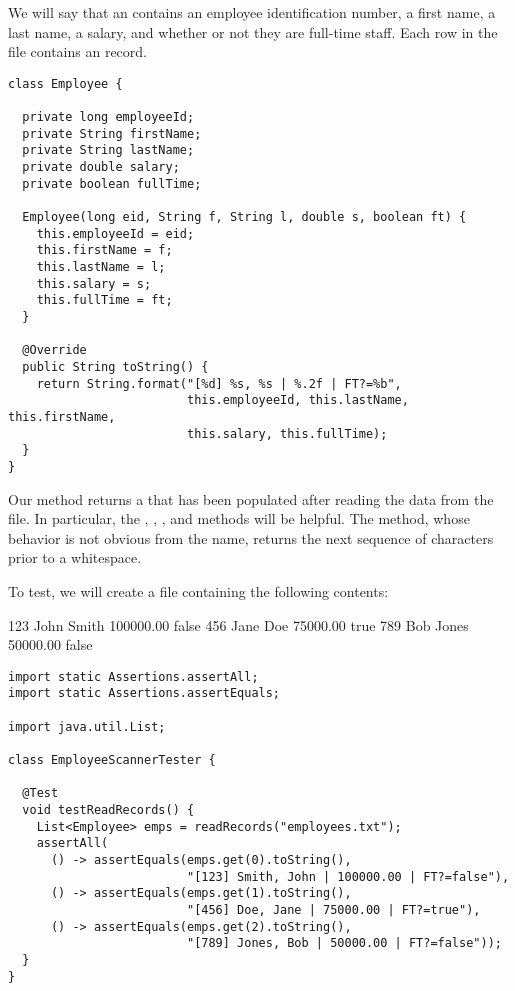 We will say that an  contains an employee identification number, a first name, a last name, a salary, and whether or not they are full-time staff. 
Each row in the file contains an  record.

\begin{lstlisting}[language=MyJava]
class Employee {

  private long employeeId;
  private String firstName;
  private String lastName;
  private double salary;
  private boolean fullTime;
  
  Employee(long eid, String f, String l, double s, boolean ft) {
    this.employeeId = eid;
    this.firstName = f;
    this.lastName = l;
    this.salary = s;
    this.fullTime = ft;
  }

  @Override
  public String toString() {
    return String.format("[%d] %s, %s | %.2f | FT?=%b", 
                         this.employeeId, this.lastName, this.firstName, 
                         this.salary, this.fullTime);
  }
}
\end{lstlisting}

Our method returns a  that has been populated after reading the data from the file. 
In particular, the , , , and  methods will be helpful. 
The  method, whose behavior is not obvious from the name, returns the next sequence of characters prior to a whitespace. 

To test, we will create a file containing the following contents:

\begin{verbnobox}[\small]
123 John Smith 100000.00 false
456 Jane Doe 75000.00 true
789 Bob Jones 50000.00 false
\end{verbnobox}

\begin{lstlisting}[language=MyJava]
import static Assertions.assertAll;
import static Assertions.assertEquals;

import java.util.List;

class EmployeeScannerTester {

  @Test
  void testReadRecords() {
    List<Employee> emps = readRecords("employees.txt");
    assertAll(
      () -> assertEquals(emps.get(0).toString(), 
                         "[123] Smith, John | 100000.00 | FT?=false"),
      () -> assertEquals(emps.get(1).toString(), 
                         "[456] Doe, Jane | 75000.00 | FT?=true"),
      () -> assertEquals(emps.get(2).toString(), 
                         "[789] Jones, Bob | 50000.00 | FT?=false"));
  }
}
\end{lstlisting}

